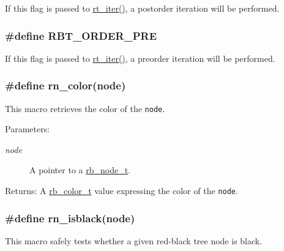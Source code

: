 If this flag is passed to \hyperlink{group__dbprim__rbtree_a11}{rt\_\-iter()}, a postorder iteration will be performed. \hypertarget{group__dbprim__rbtree_a21}{
\subsubsection[RBT\_\-ORDER\_\-PRE]{\setlength{\rightskip}{0pt plus 5cm}\#define RBT\_\-ORDER\_\-PRE}}
\label{group__dbprim__rbtree_a21}


If this flag is passed to \hyperlink{group__dbprim__rbtree_a11}{rt\_\-iter()}, a preorder iteration will be performed. \hypertarget{group__dbprim__rbtree_a27}{
\subsubsection[rn\_\-color]{\setlength{\rightskip}{0pt plus 5cm}\#define rn\_\-color(node)}}
\label{group__dbprim__rbtree_a27}


This macro retrieves the color of the {\tt node}.

\begin{Desc}
\item[Parameters:]
\begin{description}
\item[{\em node}]A pointer to a \hyperlink{group__dbprim__rbtree_a1}{rb\_\-node\_\-t}.\end{description}
\end{Desc}
\begin{Desc}
\item[Returns:]A \hyperlink{group__dbprim__rbtree_a4}{rb\_\-color\_\-t} value expressing the color of the {\tt node}. \end{Desc}
\hypertarget{group__dbprim__rbtree_a34}{
\subsubsection[rn\_\-isblack]{\setlength{\rightskip}{0pt plus 5cm}\#define rn\_\-isblack(node)}}
\label{group__dbprim__rbtree_a34}


This macro safely tests whether a given red-black tree node is black.

